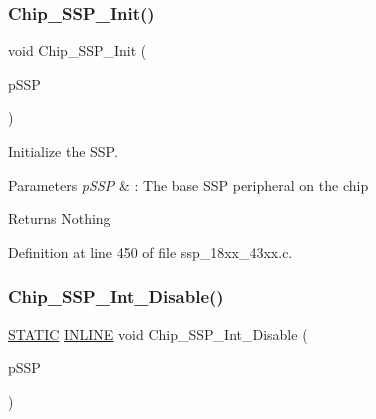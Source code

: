 \subsubsection{\texorpdfstring{Chip\+\_\+\+S\+S\+P\+\_\+\+Init()}{Chip\_SSP\_Init()}}
{\footnotesize\ttfamily void Chip\+\_\+\+S\+S\+P\+\_\+\+Init (\begin{DoxyParamCaption}\item[{\hyperlink{struct_l_p_c___s_s_p___t}{L\+P\+C\+\_\+\+S\+S\+P\+\_\+T} $\ast$}]{p\+S\+SP }\end{DoxyParamCaption})}



Initialize the S\+SP. 


\begin{DoxyParams}{Parameters}
{\em p\+S\+SP} & \+: The base S\+SP peripheral on the chip \\
\hline
\end{DoxyParams}
\begin{DoxyReturn}{Returns}
Nothing 
\end{DoxyReturn}


Definition at line 450 of file ssp\+\_\+18xx\+\_\+43xx.\+c.

\mbox{\label{group___s_s_p__18_x_x__43_x_x_ga20c7c516c84ba924973318bd64c113a3}} 
\subsubsection{\texorpdfstring{Chip\+\_\+\+S\+S\+P\+\_\+\+Int\+\_\+\+Disable()}{Chip\_SSP\_Int\_Disable()}}
{\footnotesize\ttfamily \hyperlink{group___l_p_c___types___public___macros_ga10b2d890d871e1489bb02b7e70d9bdfb}{S\+T\+A\+T\+IC} \hyperlink{spifi__18xx__43xx_8h_a2eb6f9e0395b47b8d5e3eeae4fe0c116}{I\+N\+L\+I\+NE} void Chip\+\_\+\+S\+S\+P\+\_\+\+Int\+\_\+\+Disable (\begin{DoxyParamCaption}\item[{\hyperlink{struct_l_p_c___s_s_p___t}{L\+P\+C\+\_\+\+S\+S\+P\+\_\+T} $\ast$}]{p\+S\+SP }\end{DoxyParamCaption})}



